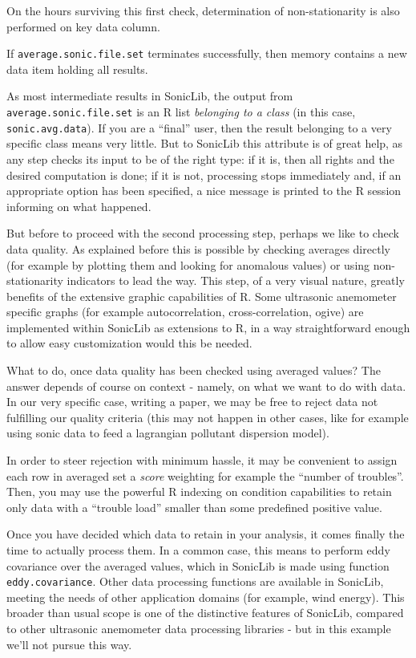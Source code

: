 \documentclass[a4paper,10pt]{book}
\begin{document}
On the hours surviving this first check, determination of non-stationarity is also performed on key data column.

If \verb|average.sonic.file.set| terminates successfully, then memory contains a new data item holding all results.

As most intermediate results in SonicLib, the output from \verb|average.sonic.file.set| is an R list \emph{belonging to a class} (in this case, \verb|sonic.avg.data|). If you are a ``final'' user, then the result belonging to a very specific class means very little. But to SonicLib this attribute is of great help, as any step checks its input to be of the right type: if it is, then all rights and the desired computation is done; if it is not, processing stops immediately and, if an appropriate option has been specified, a nice message is printed to the R session informing on what happened.

But before to proceed with the second processing step, perhaps we like to check data quality. As explained before this is possible by checking averages directly (for example by plotting them and looking for anomalous values) or using non-stationarity indicators to lead the way. This step, of a very visual nature, greatly benefits of the extensive graphic capabilities of R. Some ultrasonic anemometer specific graphs (for example autocorrelation, cross-correlation, ogive) are implemented within SonicLib as extensions to R, in a way straightforward enough to allow easy customization would this be needed.

What to do, once data quality has been checked using averaged values? The answer depends of course on context - namely, on what we want to do with data. In our very specific case, writing a paper, we may be free to reject data not fulfilling our quality criteria (this may not happen in other cases, like for example using sonic data to feed a lagrangian pollutant dispersion model).

In order to steer rejection with minimum hassle, it may be convenient to assign each row in averaged set a \emph{score} weighting for example the ``number of troubles''. Then, you may use the powerful R indexing on condition capabilities to retain only data with a ``trouble load'' smaller than some predefined positive value.

Once you have decided which data to retain in your analysis, it comes finally the time to actually process them. In a common case, this means to perform eddy covariance over the averaged values, which in SonicLib is made using function \verb|eddy.covariance|. Other data processing functions are available in SonicLib, meeting the needs of other application domains (for example, wind energy). This broader than usual scope is one of the distinctive features of SonicLib, compared to other ultrasonic anemometer data processing libraries - but in this example we'll not pursue this way.
\end{document}
